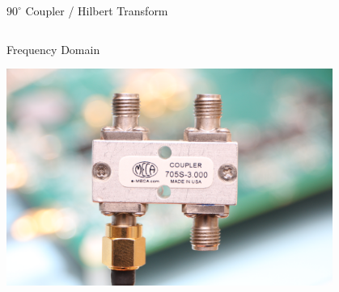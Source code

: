 \documentclass[10pt]{beamer}
\begin{document}
\begin{frame}{$90^\circ$ Coupler / Hilbert Transform}
\begin{columns}[T]
\begin{column}{.5\textwidth}
\begin{block}{Frequency Domain}
      \end{block}
      \centering
      \includegraphics[width=0.8\textwidth]{pictures/90deg}
    \end{column}
  \end{columns}
\end{frame}
\end{document}
